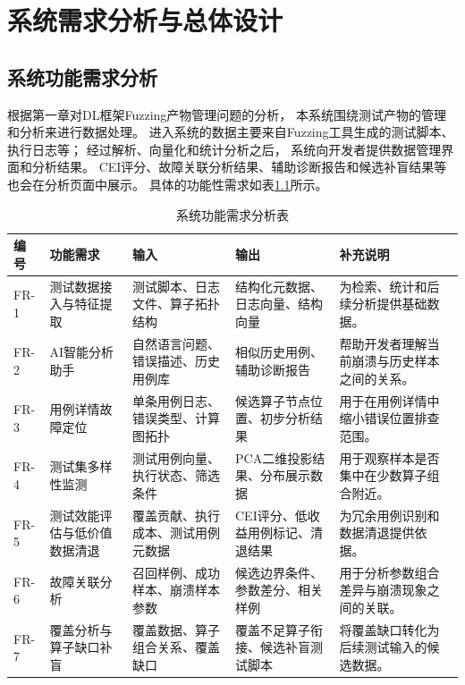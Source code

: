 ﻿%
\chapter{系统需求分析与总体设计}

\section{系统功能需求分析}

根据第一章对DL框架Fuzzing产物管理问题的分析，
本系统围绕测试产物的管理和分析来进行数据处理。
进入系统的数据主要来自Fuzzing工具生成的测试脚本、执行日志等；
经过解析、向量化和统计分析之后，
系统向开发者提供数据管理界面和分析结果。
CEI评分、故障关联分析结果、辅助诊断报告和候选补盲结果等也会在分析页面中展示。
具体的功能性需求如表\ref{tab:function_requirements}所示。

\begin{table}[htbp]
\centering
\caption{系统功能需求分析表}
\label{tab:function_requirements}
\footnotesize
\renewcommand{\arraystretch}{1.15}
\begin{tabularx}{\textwidth}{>{\raggedright\arraybackslash}p{0.8cm}>{\raggedright\arraybackslash}p{2.0cm}>{\raggedright\arraybackslash}p{2.6cm}>{\raggedright\arraybackslash}p{2.7cm}>{\raggedright\arraybackslash}X}
\toprule
编号 & 功能需求 & 输入 & 输出 & 补充说明 \\
\midrule
FR-1 & 测试数据接入与特征提取 & 测试脚本、日志文件、算子拓扑结构 & 结构化元数据、日志向量、结构向量 & 为检索、统计和后续分析提供基础数据。 \\
FR-2 & AI智能分析助手 & 自然语言问题、错误描述、历史用例库 & 相似历史用例、辅助诊断报告 & 帮助开发者理解当前崩溃与历史样本之间的关系。 \\
FR-3 & 用例详情故障定位 & 单条用例日志、错误类型、计算图拓扑 & 候选算子节点位置、初步分析结果 & 用于在用例详情中缩小错误位置排查范围。 \\
FR-4 & 测试集多样性监测 & 测试用例向量、执行状态、筛选条件 & PCA二维投影结果、分布展示数据 & 用于观察样本是否集中在少数算子组合附近。 \\
FR-5 & 测试效能评估与低价值数据清退 & 覆盖贡献、执行成本、测试用例元数据 & CEI评分、低收益用例标记、清退结果 & 为冗余用例识别和数据清退提供依据。 \\
FR-6 & 故障关联分析 & 召回样例、成功样本、崩溃样本参数 & 候选边界条件、参数差分、相关样例 & 用于分析参数组合差异与崩溃现象之间的关联。 \\
FR-7 & 覆盖分析与算子缺口补盲 & 覆盖数据、算子组合关系、覆盖缺口 & 覆盖不足算子衔接、候选补盲测试脚本 & 将覆盖缺口转化为后续测试输入的候选数据。 \\
\bottomrule
\end{tabularx}
\end{table}

